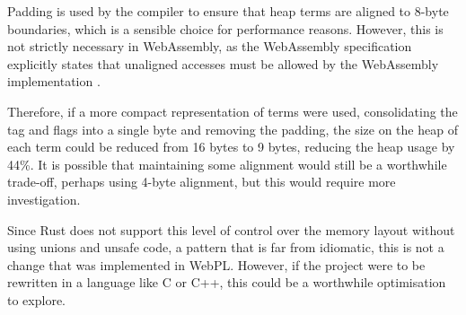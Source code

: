 Padding is used by the compiler to ensure that heap terms are aligned to 8-byte boundaries, which is a sensible choice for performance reasons. However, this is not strictly necessary in WebAssembly, as the WebAssembly specification explicitly states that unaligned accesses must be allowed by the WebAssembly implementation \cite{rossbergWebAssemblyCoreSpecification2022}.

Therefore, if a more compact representation of terms were used, consolidating the tag and flags into a single byte and removing the padding, the size on the heap of each term could be reduced from 16 bytes to 9 bytes, reducing the heap usage by 44\%. It is possible that maintaining some alignment would still be a worthwhile trade-off, perhaps using 4-byte alignment, but this would require more investigation.

Since Rust does not support this level of control over the memory layout without using unions and unsafe code, a pattern that is far from idiomatic, this is not a change that was implemented in WebPL. However, if the project were to be rewritten in a language like C or C++, this could be a worthwhile optimisation to explore.